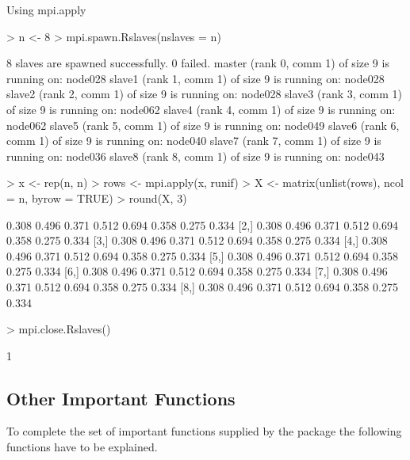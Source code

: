 \begin{Example} Using mpi.apply
\label{ex:Rmpi3}
\begin{Schunk}
\begin{Sinput}
> n <- 8
> mpi.spawn.Rslaves(nslaves = n)
\end{Sinput}
\begin{Soutput}
	8 slaves are spawned successfully. 0 failed.
master (rank 0, comm 1) of size 9 is running on: node028 
slave1 (rank 1, comm 1) of size 9 is running on: node028 
slave2 (rank 2, comm 1) of size 9 is running on: node028 
slave3 (rank 3, comm 1) of size 9 is running on: node062 
slave4 (rank 4, comm 1) of size 9 is running on: node062 
slave5 (rank 5, comm 1) of size 9 is running on: node049 
slave6 (rank 6, comm 1) of size 9 is running on: node040 
slave7 (rank 7, comm 1) of size 9 is running on: node036 
slave8 (rank 8, comm 1) of size 9 is running on: node043 
\end{Soutput}
\begin{Sinput}
> x <- rep(n, n)
> rows <- mpi.apply(x, runif)
> X <- matrix(unlist(rows), ncol = n, byrow = TRUE)
> round(X, 3)
\end{Sinput}
\begin{Soutput}
      [,1]  [,2]  [,3]  [,4]  [,5]  [,6]  [,7]  [,8]
[1,] 0.308 0.496 0.371 0.512 0.694 0.358 0.275 0.334
[2,] 0.308 0.496 0.371 0.512 0.694 0.358 0.275 0.334
[3,] 0.308 0.496 0.371 0.512 0.694 0.358 0.275 0.334
[4,] 0.308 0.496 0.371 0.512 0.694 0.358 0.275 0.334
[5,] 0.308 0.496 0.371 0.512 0.694 0.358 0.275 0.334
[6,] 0.308 0.496 0.371 0.512 0.694 0.358 0.275 0.334
[7,] 0.308 0.496 0.371 0.512 0.694 0.358 0.275 0.334
[8,] 0.308 0.496 0.371 0.512 0.694 0.358 0.275 0.334
\end{Soutput}
\begin{Sinput}
> mpi.close.Rslaves()
\end{Sinput}
\begin{Soutput}
[1] 1
\end{Soutput}
\end{Schunk}
\end{Example}

\subsection{Other Important Functions}

To complete the set of important functions supplied by the 
package the following functions have to be explained.

